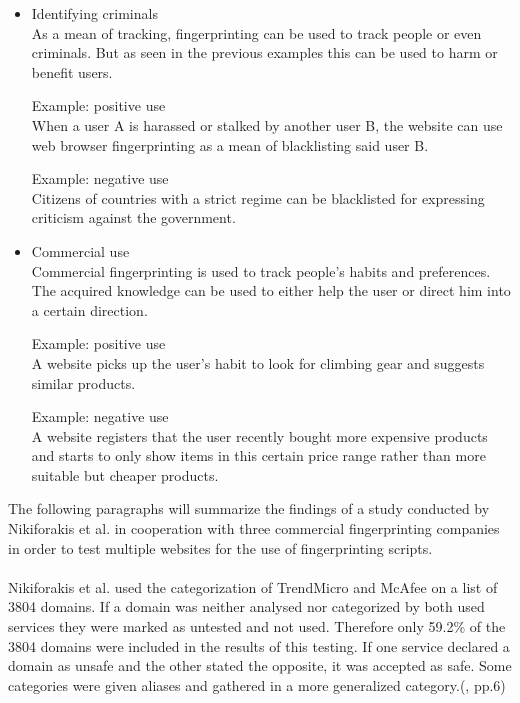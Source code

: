 \begin{itemize}
	\item Identifying criminals\\
	As a mean of tracking, fingerprinting can be used to track people or even criminals. But as seen in the previous examples this can be used to harm or benefit users. 
	\begin{tcolorbox}
	Example: positive use\\
	When a user A is harassed or stalked by another user B, the website can use web browser fingerprinting as a mean of blacklisting said user B. 
	\end{tcolorbox}
	\begin{tcolorbox}
	Example: negative use\\
	Citizens of countries with a strict regime can be blacklisted for expressing criticism against the government.
	\end{tcolorbox}
	\item Commercial use\\
	Commercial fingerprinting is used to track people’s habits and preferences. The acquired knowledge can be used to either help the user or direct him into a certain direction. 
	\begin{tcolorbox}
	Example: positive use\\
	A website picks up the user’s habit to look for climbing gear and suggests similar products.
	\end{tcolorbox}
	\begin{tcolorbox}
	Example: negative use\\
	A website registers that the user recently bought more expensive products and starts to only show items in this certain price range rather than more suitable but cheaper products.
	\end{tcolorbox}
\end{itemize}
The following paragraphs will summarize the findings of a study conducted by Nikiforakis et al. in cooperation with three commercial fingerprinting companies in order to test multiple websites for the use of fingerprinting scripts.\\\\
Nikiforakis et al. used the categorization of TrendMicro and McAfee on a list of 3804 domains. If a domain was neither analysed nor categorized by both used services they were marked as untested and not used. Therefore only 59.2\% of the 3804 domains were included in the results of this testing. If one service declared a domain as unsafe and the other stated the opposite, it was accepted as safe. Some categories were given aliases and gathered in a more generalized category.(\textcite{nikiforakis13}, pp.6)\\
